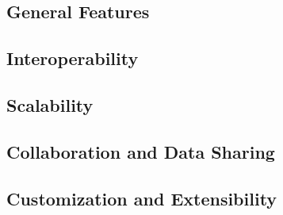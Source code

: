 \subsection{General Features}

\subsection{Interoperability}

\subsection{Scalability}

\subsection{Collaboration and Data Sharing}

\subsection{Customization and Extensibility}

